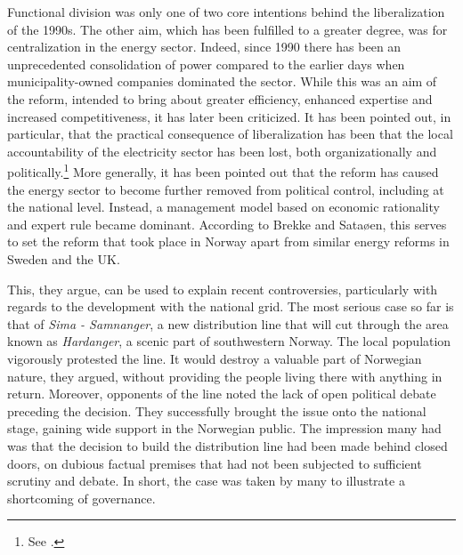 Functional division was only one of two core intentions behind the liberalization of the 1990s. The other aim, which has been fulfilled to a greater degree, was for centralization in the energy sector. Indeed, since 1990 there has been an unprecedented consolidation of power compared to the earlier days when municipality-owned companies dominated the sector. While this was an aim of the reform, intended to bring about greater efficiency, enhanced expertise and increased competitiveness, it has later been criticized. It has been pointed out, in particular, that the practical consequence of liberalization has been that the local accountability of the electricity sector has been lost, both organizationally and politically.\footnote{See \cite{agnell11}.} More generally, it has been pointed out that the reform has caused the energy sector to become further removed from political control, including at the national level. Instead, a management model based on economic rationality and expert rule became dominant. According to Brekke and Sataøen, this serves to set the reform that took place in Norway apart from similar energy reforms in Sweden and the UK. 

This, they argue, can be used to explain recent controversies, particularly with regards to the development with the national grid. The most serious case so far is that of {\it Sima - Samnanger}, a new distribution line that will cut through the area known as {\it Hardanger}, a scenic part of southwestern Norway. The local population vigorously protested the line. It would destroy a valuable part of Norwegian nature, they argued, without providing the people living there with anything in return. Moreover, opponents of the line noted the lack of open political debate preceding the decision. They successfully brought the issue onto the national stage, gaining wide support in the Norwegian public. The impression many had was that the decision to build the distribution line had been made behind closed doors, on dubious factual premises that had not been subjected to sufficient scrutiny and debate. In short, the case was taken by many to illustrate a shortcoming of governance.

